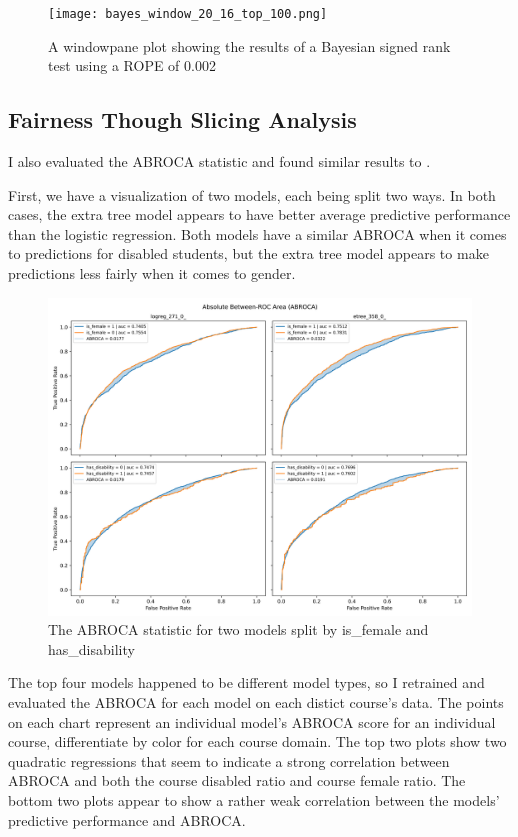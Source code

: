 \documentclass{article}
\begin{document}
        \begin{figure}
            \centering
            \texttt{[image: bayes\_window\_20\_16\_top\_100.png]}
            \caption{A windowpane plot showing the results of a Bayesian signed rank test using a ROPE of 0.002}
            \label{fig:bayes_window_20_16_top_100}
        \end{figure}

    \subsection{Fairness Though Slicing Analysis}
        I also evaluated the ABROCA statistic and found similar results to \cite{eval2019}.

        First, we have a visualization of two models, each being split two ways.
        In both cases, the extra tree model appears to have better average predictive performance than the logistic regression.
        Both models have a similar ABROCA when it comes to predictions for disabled students, but the extra tree model appears to make predictions less fairly when it comes to gender. 

        \begin{figure}
            \centering
            \includegraphics[width=1\textwidth]{abroca_logreg_271_0_etree_358_0_.png}
            \caption{The ABROCA statistic for two models split by is\_female and has\_disability}
            \label{fig:abroca_logreg_271_0_etree_358_0_}
        \end{figure}

        The top four models happened to be different model types, so I retrained and evaluated the ABROCA for each model on each distict course's data.
        The points on each chart represent an individual model's ABROCA score for an individual course, differentiate by color for each course domain. 
        The top two plots show two quadratic regressions that seem to indicate a strong correlation between ABROCA and both the course disabled ratio and course female ratio.
        The bottom two plots appear to show a rather weak correlation between the models' predictive performance and ABROCA.
\end{document}

